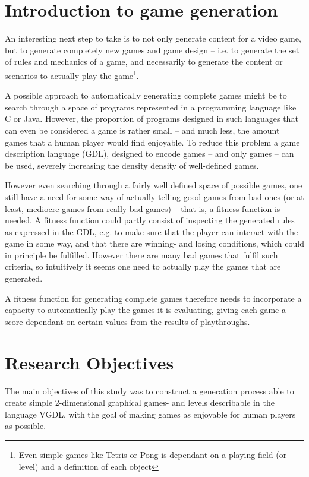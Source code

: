 \documentclass[a4paper,titlepage,final]{report}
\begin{document}

\section{Introduction to game generation}
\label{sec_introtogamegen}
An interesting next step to take is to not only generate content for a video game, but to generate completely new games and game design -- i.e. to generate the set of rules and mechanics of a game, and necessarily to generate the content or scenarios to actually play the game\footnote{Even simple games like Tetris or Pong is dependant on a playing field (or level) and a definition of each object}.

A possible approach to automatically generating complete games might be to search through a space of programs represented in a programming language like C or Java. 
However, the proportion of programs designed in such languages that can even be considered a game is rather small -- and much less, the amount games that a human player would find enjoyable.
To reduce this problem a game description language (GDL), designed to encode games -- and only games -- can be used, severely increasing the density density of well-defined games.

However even searching through a fairly well defined space of possible games, one still have a need for some way of actually telling good games from bad ones (or at least, mediocre games from really bad games) -- that is, a fitness function is needed. 
A fitness function could partly consist of inspecting the generated rules as expressed in the GDL, e.g. to make sure that the player can interact with the game in some way, and that there are winning- and losing conditions, which could in principle be fulfilled. 
However there are many bad games that fulfil such criteria, so intuitively it seems one need to actually play the games that are generated. 

A fitness function for generating complete games therefore needs to incorporate a capacity to automatically play the games it is evaluating, giving each game a score dependant on certain values from the results of playthroughs.


\section{Research Objectives}
\label{sec_researchobj}
The main objectives of this study was to construct a generation process able to create simple 2-dimensional graphical games- and levels describable in the language VGDL, with the goal of making games as enjoyable for human players as possible.
\end{document}
